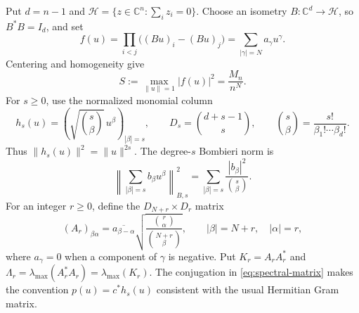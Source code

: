 \documentclass[11pt]{article}
\theoremstyle{remark}
\newcommand{\C}{\mathbb C}
\numberwithin{equation}{section}
\begin{document}
Put $d=n-1$ and $\mathcal H=\{z\in\C^n:\sum_i z_i=0\}$. Choose an
isometry $B:\C^d\longrightarrow\mathcal H$, so $B^*B=I_d$, and set
\[
 f(u)=\prod_{i<j}\big((Bu)_i-(Bu)_j\big)
      =\sum_{|\gamma|=N}a_\gamma u^\gamma.
\]
Centering and homogeneity give
\begin{equation}\label{eq:spectral-normalization}
 S:=\max_{\|u\|=1}|f(u)|^2=\frac{M_n}{n^N}.
\end{equation}
For $s\ge0$, use the normalized monomial column
\[
 h_s(u)=\left(\sqrt{\binom{s}{\beta}}\,u^\beta\right)_{|\beta|=s},
 \qquad D_s=\binom{d+s-1}{s},\qquad
 \binom{s}{\beta}=\frac{s!}{\beta_1!\cdots\beta_d!}.
\]
Thus $\|h_s(u)\|^2=\|u\|^{2s}$. The degree-$s$ Bombieri norm is
\[
 \left\|\sum_{|\beta|=s}b_\beta u^\beta\right\|_{B,s}^2
 =\sum_{|\beta|=s}\frac{|b_\beta|^2}{\binom{s}{\beta}}.
\]
For an integer $r\ge0$, define the $D_{N+r}\times D_r$ matrix
\begin{equation}\label{eq:spectral-matrix}
 (A_r)_{\beta\alpha}
 =\overline{a_{\beta-\alpha}}
   \sqrt{\frac{\binom r\alpha}{\binom{N+r}\beta}},
 \qquad |\beta|=N+r,\quad |\alpha|=r,
\end{equation}
where $a_\gamma=0$ when a component of $\gamma$ is negative. Put
$K_r=A_rA_r^*$ and
$\Lambda_r=\lambda_{\max}(A_r^*A_r)=\lambda_{\max}(K_r)$.
The conjugation in \eqref{eq:spectral-matrix} makes the convention
$p(u)=c^*h_s(u)$ consistent with the usual Hermitian Gram matrix.
\end{document}
